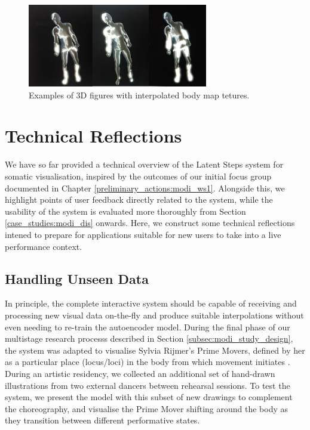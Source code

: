 \begin{figure}[ht]
    \centering
    \includegraphics[width=0.7\textwidth]{Chapters/Figures/modi_dis/3d_render_examples.png}
    \caption{Examples of 3D figures with interpolated body map tetures.}
    \label{fig:3d_render}
\end{figure}

\section{Technical Reflections}

We have so far provided a technical overview of the Latent Steps system for somatic visualisation, inspired by the outcomes of our initial focus group documented in Chapter \ref{preliminary_actions:modi_ws1}. Alongside this, we highlight points of user feedback directly related to the system, while the usability of the system is evaluated more thoroughly from Section \ref{case_studies:modi_dis} onwards. Here, we construct some technical reflections intened to prepare for applications suitable for new users to take into a live performance context.

\subsection*{Handling Unseen Data}

In principle, the complete interactive system should be capable of receiving and processing new visual data on-the-fly and produce suitable interpolations without even needing to re-train the autoencoder model. During the final phase of our multistage research processs described in Section \ref{subsec:modi_study_design}, the system was adapted to visualise Sylvia Rijmer's Prime Movers, defined by her as a particular place (locus/loci) in the body from which movement initiates \cite{jurgens_designing_2020}. During an artistic residency, we collected an additional set of hand-drawn illustrations from two external dancers between rehearsal sessions. To test the system, we present the model with this subset of new drawings to complement the choreography, and visualise the Prime Mover shifting around the body as they transition between different performative states.

